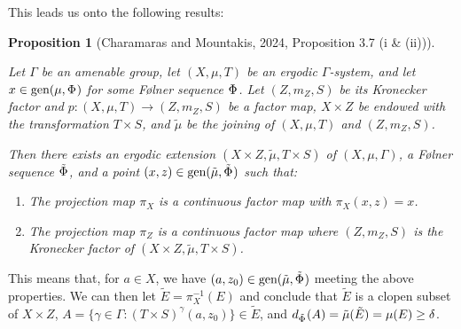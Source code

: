 \documentclass[
  british,
]{article}
\providecommand{\tightlist}{%
  \setlength{\itemsep}{0pt}\setlength{\parskip}{0pt}}
\theoremstyle{definition}
\theoremstyle{plain}
\theoremstyle{plain}
\theoremstyle{plain}
\newtheorem{proposition}{Proposition}[section]
\theoremstyle{remark}
\newcommand{\AmenableGroup}{{\Gamma}}
\newcommand{\AmenableGroupElement}{{\gamma}}
\newcommand{\Folner}[1][\vphantom{}]{{\Phi}_{#1}}
\newcommand{\KroneckerFactorMap}{p}
\newcommand{\KroneckerMeasure}{{m_Z}}
\newcommand{\KroneckerProductAction}[2]{(T\times S)^{#1}{#2}}
\newcommand{\KroneckerSpace}{{Z}}
\newcommand{\KroneckerSpaceElement}{{z}}
\newcommand{\Measure}{{\mu}}
\newcommand{\ProjectionMap}[1][\vphantom{}]{{\pi}_{#1}}
\newcommand{\ShiftSpace}{{X}}
\newcommand{\ShiftSpaceElement}{{x}}
\newcommand{\Density}[2][\Folner]{d_{{#1}}({#2})}
\newcommand{\FurstenbergSystem}{(\ShiftSpace,\Measure,T)}
\newcommand{\KroneckerFactor}{{(\KroneckerSpace,\KroneckerMeasure,S)}}
\begin{document}
This leads us onto the following results:

\begin{proposition}[{Charamaras and Mountakis, 2024, Proposition 3.7 (i
\&
(ii))}]\protect\hypertarget{prp-KroneckerGenericContinuous}{}\label{prp-KroneckerGenericContinuous}

Let \(\AmenableGroup\) be an amenable group, let \(\FurstenbergSystem\)
be an ergodic \(\AmenableGroup\)-system, and let
\(\ShiftSpaceElement\in\text{gen}(\Measure,\Folner)\) for some Følner
sequence \(\Folner\). Let \(\KroneckerFactor\) be its Kronecker factor
and
\(\KroneckerFactorMap: \FurstenbergSystem\rightarrow\KroneckerFactor\)
be a factor map, \(\ShiftSpace\times\KroneckerSpace\) be endowed with
the transformation \(T\times S\), and \(\tilde{\Measure}\) be the
joining of \(\FurstenbergSystem\) and \(\KroneckerFactor\).

Then there exists an ergodic extension
\((\ShiftSpace\times\KroneckerSpace, \tilde{\Measure}, T\times S)\) of
\((\ShiftSpace,\Measure,\AmenableGroup)\), a Følner sequence
\(\tilde{\Folner}\), and a point
\((\ShiftSpaceElement,\KroneckerSpaceElement)\in\text{gen}(\tilde{\Measure},\tilde{\Folner})\)
such that:

\begin{enumerate}
\def\labelenumi{\arabic{enumi}.}
\tightlist
\item
  The projection map \(\ProjectionMap[\ShiftSpace]\) is a continuous
  factor map with
  \(\ProjectionMap[\ShiftSpace](\ShiftSpaceElement,\KroneckerSpaceElement)=\ShiftSpaceElement\).
\item
  The projection map \(\ProjectionMap[\KroneckerSpace]\) is a continuous
  factor map where \(\KroneckerFactor\) is the Kronecker factor of
  \((\ShiftSpace\times\KroneckerSpace, \tilde{\Measure}, T\times S)\).
\end{enumerate}

\end{proposition}

This means that, for \(a\in\ShiftSpace\), we have
\((a,\KroneckerSpaceElement_0)\in\text{gen}(\tilde{\Measure},\tilde{\Folner})\)
meeting the above properties. We can then let
\(\tilde{E}=\ProjectionMap[\ShiftSpace]^{-1}(E)\) and conclude that
\(\tilde{E}\) is a clopen subset of
\(\ShiftSpace\times\KroneckerSpace\),
\(A=\{\AmenableGroupElement\in \AmenableGroup:\KroneckerProductAction{\AmenableGroupElement}{(a,\KroneckerSpaceElement_0)\}\in \tilde{E}}\),
and
\(\Density[\tilde{\Folner}]{A}=\tilde{\Measure}(\tilde{E})=\Measure(E)\geq\delta\).
\end{document}
